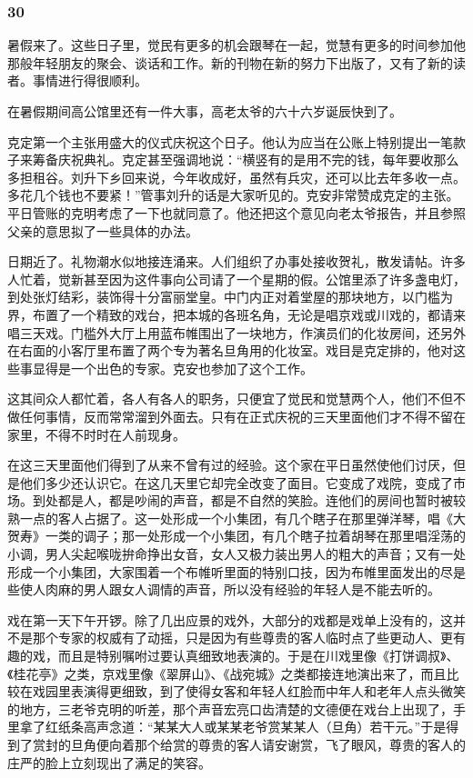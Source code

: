 \subsubsection*{30}

\par 暑假来了。这些日子里，觉民有更多的机会跟琴在一起，觉慧有更多的时间参加他那般年轻朋友的聚会、谈话和工作。新的刊物在新的努力下出版了，又有了新的读者。事情进行得很顺利。
\par 在暑假期间高公馆里还有一件大事，高老太爷的六十六岁诞辰快到了。
\par 克定第一个主张用盛大的仪式庆祝这个日子。他认为应当在公账上特别提出一笔款子来筹备庆祝典礼。克定甚至强调地说：“横竖有的是用不完的钱，每年要收那么多担租谷。刘升下乡回来说，今年收成好，虽然有兵灾，还可以比去年多收一点。多花几个钱也不要紧！”管事刘升的话是大家听见的。克安非常赞成克定的主张。平日管账的克明考虑了一下也就同意了。他还把这个意见向老太爷报告，并且参照父亲的意思拟了一些具体的办法。
\par 日期近了。礼物潮水似地接连涌来。人们组织了办事处接收贺礼，散发请帖。许多人忙着，觉新甚至因为这件事向公司请了一个星期的假。公馆里添了许多盏电灯，到处张灯结彩，装饰得十分富丽堂皇。中门内正对着堂屋的那块地方，以门槛为界，布置了一个精致的戏台，把本城的各班名角，无论是唱京戏或川戏的，都请来唱三天戏。门槛外大厅上用蓝布帷围出了一块地方，作演员们的化妆房间，还另外在右面的小客厅里布置了两个专为著名旦角用的化妆室。戏目是克定排的，他对这些事显得是一个出色的专家。克安也参加了这个工作。
\par 这其间众人都忙着，各人有各人的职务，只便宜了觉民和觉慧两个人，他们不但不做任何事情，反而常常溜到外面去。只有在正式庆祝的三天里面他们才不得不留在家里，不得不时时在人前现身。
\par 在这三天里面他们得到了从来不曾有过的经验。这个家在平日虽然使他们讨厌，但是他们多少还认识它。在这几天里它却完全改变了面目。它变成了戏院，变成了市场。到处都是人，都是吵闹的声音，都是不自然的笑脸。连他们的房间也暂时被较熟一点的客人占据了。这一处形成一个小集团，有几个瞎子在那里弹洋琴，唱《大贺寿》一类的调子；那一处形成一个小集团，有几个瞎子拉着胡琴在那里唱淫荡的小调，男人尖起喉咙拚命挣出女音，女人又极力装出男人的粗大的声音；又有一处形成一个小集团，大家围着一个布帷听里面的特别口技，因为布帷里面发出的尽是些使人肉麻的男人跟女人调情的声音，所以没有经验的年轻人是不能去听的。
\par 戏在第一天下午开锣。除了几出应景的戏外，大部分的戏都是戏单上没有的，这并不是那个专家的权威有了动摇，只是因为有些尊贵的客人临时点了些更动人、更有趣的戏，而且是特别嘱咐过要认真细致地表演的。于是在川戏里像《打饼调叔》、《桂花亭》之类，京戏里像《翠屏山》、《战宛城》之类都接连地演出来了，而且比较在戏园里表演得更细致，到了使得女客和年轻人红脸而中年人和老年人点头微笑的地方，三老爷克明的听差，那个声音宏亮口齿清楚的文德便在戏台上出现了，手里拿了红纸条高声念道：“某某大人或某某老爷赏某某人（旦角）若干元。”于是得到了赏封的旦角便向着那个给赏的尊贵的客人请安谢赏，飞了眼风，尊贵的客人的庄严的脸上立刻现出了满足的笑容。
